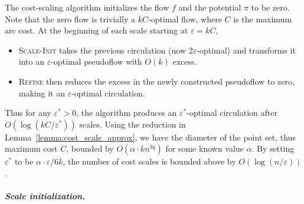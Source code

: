 \documentclass[a4paper,UKenglish]{socg-lipics-v2018}
\def\eps{\varepsilon}
\theoremstyle{plain}
\numberwithin{figure}{section}
\renewcommand{\paragraph}{\subparagraph}
\begin{document}
%

The cost-scaling algorithm initializes the flow $f$ and the potential $\pi$ to be zero.
Note that the zero flow is trivially a $kC$-optimal flow, where $C$ is the maximum arc cost.
At the beginning of each scale starting at $\eps = kC$,
\begin{itemize}
\item
\textsc{Scale-Init} takes the previous
circulation (now $2\eps$-optimal) and transforms it into an $\eps$-optimal
pseudoflow with $O(k)$ excess.
\item
\textsc{Refine} then reduces the excess in the newly constructed pseudoflow to zero, making it an $\eps$-optimal
circulation.
\end{itemize}
Thus for any $\eps^* > 0$, the algorithm produces an $\eps^*$-optimal circulation after
$O(\log(kC/\eps^*))$ scales.
%
Using the reduction in Lemma~\ref{lemma:cost_scale_approx}, we have the
diameter of the point set, thus maximum cost $C$, bounded by
$O(\alpha \cdot kn^{3q})$ for some known value $\alpha$.
By setting $\eps^*$ to be $\alpha \cdot \eps/6k$, the number of cost scales is
bounded above by $O(\log(n/\eps))$.


\paragraph{Scale initialization.}
\end{document}

